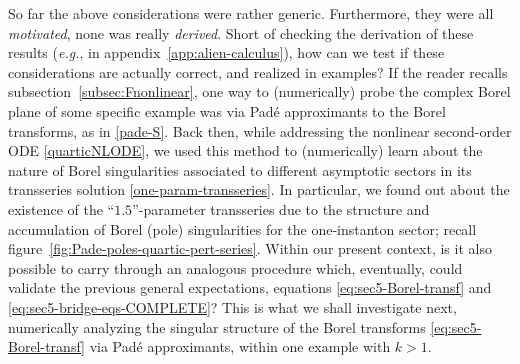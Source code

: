 \documentclass[11pt,a4paper]{article}
\begin{document}
So far the above considerations were rather generic. Furthermore, they were all \textit{motivated}, none was really \textit{derived}. Short of checking the derivation of these results (\textit{e.g.}, in appendix~\ref{app:alien-calculus}), how can we test if these considerations are actually correct, and realized in examples? If the reader recalls subsection~\ref{subsec:Fnonlinear}, one way to (numerically) probe the complex Borel plane of some specific example was via Pad\'e approximants to the Borel transforms, as in \eqref{pade-S}. Back then, while addressing the nonlinear second-order ODE \eqref{quarticNLODE}, we used this method to (numerically) learn about the nature of Borel singularities associated to different asymptotic sectors in its transseries solution \eqref{one-param-transseries}. In particular, we found out about the existence of the ``$1.5$''-parameter transseries due to the structure and accumulation of Borel (pole) singularities for the one-instanton sector; recall figure~\ref{fig:Pade-poles-quartic-pert-series}. Within our present context, is it also possible to carry through an analogous procedure which, eventually, could validate the previous general expectations, equations \eqref{eq:sec5-Borel-transf} and \eqref{eq:sec5-bridge-eqs-COMPLETE}? This is what we shall investigate next, numerically analyzing the singular structure of the Borel transforms \eqref{eq:sec5-Borel-transf} via Pad\'e approximants, within one example with $k>1$.
\end{document}
